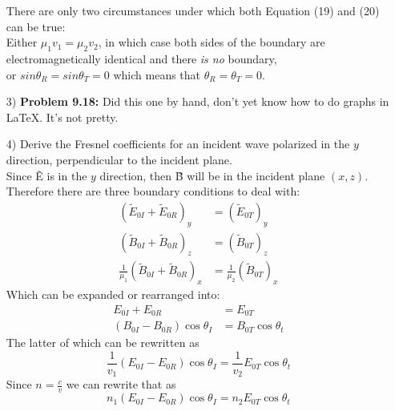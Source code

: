 \documentclass{report}
\begin{document}
\begin{itemize}
There are only two circumstances under which both Equation (19) and (20) can be true: \\
Either $\mu_1v_1 = \mu_2v_2$, in which case both sides of the boundary are electromagnetically identical and there \textit{is no} boundary,\\
or $sin{\theta_R} = sin{\theta_T} = 0$ which means that $\theta_R = \theta_T = 0$.
\item[3)] \textbf{Problem 9.18:} Did this one by hand, don't yet know how to do graphs in \LaTeX. It's not pretty.
\item[4)] Derive the Fresnel coefficients for an incident wave polarized in the $y$ direction, perpendicular to the incident plane.\\ \newline
Since \~{E} is in the $y$ direction, then \~{B} will be in the incident plane $(x,z)$. Therefore there are three boundary conditions to deal with:
\begin{align}
  (\tilde{E}_{0I}+\tilde{E}_{0R})_{y} & = (\tilde{E}_{0T})_{y}\\
  (\tilde{B}_{0I}+\tilde{B}_{0R})_{z} & = (\tilde{B}_{0T})_{z}\\
  \frac{1}{\mu_1}(\tilde{B}_{0I}+\tilde{B}_{0R})_{x} & = \frac{1}{\mu_2}(\tilde{B}_{0T})_{x}
\end{align}
Which can be expanded or rearranged into:
\begin{align}
  E_{0I}+E_{0R} & = E_{0T}\\
  (B_{0I}-B_{0R})\cos{\theta_I} & = B_{0T}\cos{\theta_t}
\end{align}
The latter of which can be rewritten as
\begin{equation}
  \frac{1}{v_1} (E_{0I}-E_{0R})\cos{\theta_I}  = \frac{1}{v_2} E_{0T}\cos{\theta_t}
\end{equation}
Since $n=\frac{c}{v}$ we can rewrite that as
\begin{equation}
  n_1(E_{0I}-E_{0R})\cos{\theta_I}  = n_2 E_{0T}\cos{\theta_t}
\end{equation}




  \end{itemize}
   
\end{document}
